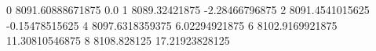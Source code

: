 0 8091.60888671875 0.0
1 8089.32421875 -2.28466796875
2 8091.4541015625 -0.15478515625
4 8097.6318359375 6.02294921875
6 8102.9169921875 11.30810546875
8 8108.828125 17.21923828125
